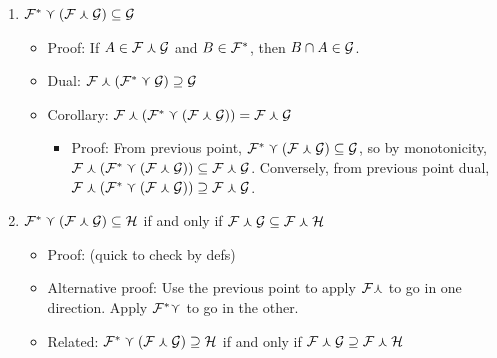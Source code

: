 \begin{enumerate}
\begin{itemize}
        \item Equality does not hold in general: set $\family = \syndetic$, $\familytwo = \thick$, and $\familythree = \syndetic$.

        \item Dual: (write it)
    \end{itemize}

    \item $\mathcal{F}^* \curlyvee (\mathcal{F} \curlywedge \mathcal{G}) \subseteq \mathcal{G}$
    \begin{itemize}
        \item Proof: If $A \in \mathcal{F} \curlywedge \mathcal{G}$ and $B \in \mathcal{F}^*$, then $B \cap A \in \mathcal{G}$.

        \item Dual: $\mathcal{F} \curlywedge (\mathcal{F}^* \curlyvee \mathcal{G}) \supseteq \mathcal{G}$

        \item Corollary: $\mathcal{F} \curlywedge (\mathcal{F}^* \curlyvee (\mathcal{F} \curlywedge \mathcal{G})) = \mathcal{F} \curlywedge \mathcal{G}$
        \begin{itemize}
            \item Proof: From previous point, $\mathcal{F}^* \curlyvee (\mathcal{F} \curlywedge \mathcal{G}) \subseteq \mathcal{G}$, so by monotonicity, $\mathcal{F} \curlywedge (\mathcal{F}^* \curlyvee (\mathcal{F} \curlywedge \mathcal{G})) \subseteq \mathcal{F} \curlywedge \mathcal{G}$.  Conversely, from previous point dual,  $\mathcal{F} \curlywedge (\mathcal{F}^* \curlyvee (\mathcal{F} \curlywedge \mathcal{G})) \supseteq \mathcal{F} \curlywedge \mathcal{G}$.  
        \end{itemize}

    \end{itemize}
    
    \item $\mathcal{F}^* \curlyvee (\mathcal{F} \curlywedge \mathcal{G}) \subseteq \mathcal{H}$ if and only if $\mathcal{F} \curlywedge \mathcal{G} \subseteq \mathcal{F} \curlywedge \mathcal{H}$
    \begin{itemize}
        \item Proof: (quick to check by defs)

        \item Alternative proof: Use the previous point to apply $\mathcal{F} \curlywedge$ to go in one direction.  Apply $\mathcal{F}^* \curlyvee$ to go in the other.

        \item Related: $\mathcal{F}^* \curlyvee (\mathcal{F} \curlywedge \mathcal{G}) \supseteq \mathcal{H}$ if and only if $\mathcal{F} \curlywedge \mathcal{G} \supseteq \mathcal{F} \curlywedge \mathcal{H}$


\end{itemize}
\end{enumerate}
